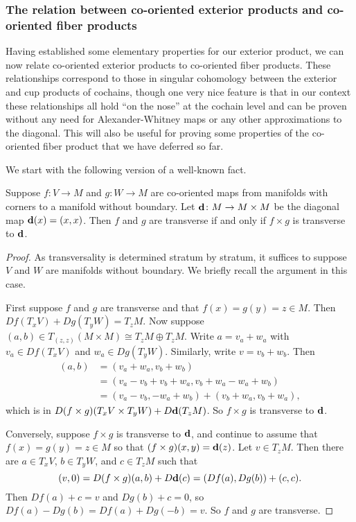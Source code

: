 \subsubsection{The relation between co-oriented exterior products and co-oriented fiber products}\label{S: product relations}

Having established some elementary properties for our exterior product, we can now relate co-oriented exterior products to co-oriented fiber products.
These relationships correspond to those in singular cohomology between the exterior and cup products of cochains, though one very nice feature is that in our context these relationships all hold ``on the nose'' at the cochain level and can be proven without any need for Alexander-Whitney maps or any other approximations to the diagonal.
This will also be useful for proving some properties of the co-oriented fiber product that we have deferred so far.

We start with the following version of a well-known fact. 


\begin{lemma}\label{L: alternative transversality}
	Suppose $f \colon V \to M$ and $g \colon W \to M$ are co-oriented maps from manifolds with corners to a manifold without boundary.
	Let $\mathbf{d} \colon M \to M \times M$ be the diagonal map $\mathbf{d}(x) = (x,x)$.
	Then $f$ and $g$ are transverse if and only if $f \times g$ is transverse to $\mathbf{d}$.
\end{lemma}
\begin{proof}
	As transversality is determined stratum by stratum, it suffices to suppose $V$ and $W$ are manifolds without boundary. 
	We briefly recall the argument in this case.
	
	First suppose $f$ and $g$ are transverse and that $f(x) = g(y) = z \in M$.
	Then $Df(T_xV)+Dg(T_yW) = T_zM$.
	Now suppose $(a,b) \in T_{(z,z)}(M \times M) \cong T_zM \oplus T_zM$.
	Write $a = v_a+w_a$ with $v_a \in Df(T_xV)$ and $w_a \in Dg(T_yW)$.
	Similarly, write $v = v_b+w_b$.
	Then
	\begin{align*}
		(a,b)& = (v_a+w_a,v_b+w_b)\\
		& = (v_a-v_b+v_b+w_a, v_b+w_a-w_a+w_b)\\
		& = (v_a-v_b,-w_a+w_b)+(v_b+w_a, v_b+w_a),
	\end{align*}
	which is in $D(f \times g)(T_xV \times T_yW)+D\mathbf{d}(T_zM)$.
	So $f \times g$ is transverse to $\mathbf{d}$.

	Conversely, suppose $f \times g$ is transverse to $\mathbf{d}$, and continue to assume that $f(x) = g(y) = z \in M$ so that $(f \times g)(x,y) = \mathbf{d}(z)$. 
	Let $v \in T_zM$.
	Then there are $a\in T_x V$, $b \in T_y W$, and $c \in T_zM$ such that $$(v,0) = D(f \times g)(a,b) + D\mathbf{d}(c) = (Df(a), Dg(b)) + (c,c).$$
	Then $Df(a) + c = v$ and $Dg(b) + c = 0$, so $Df(a) - Dg(b) = Df(a) + Dg(-b) = v$.
	So $f$ and $g$ are transverse.
\end{proof}


